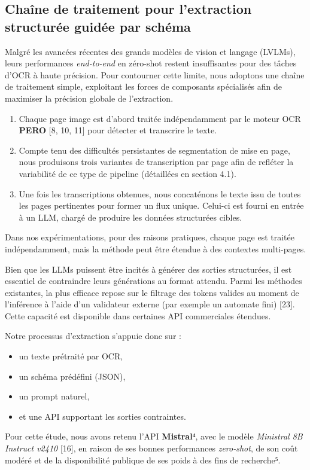 \subsection{Chaîne de traitement pour l’extraction structurée guidée par schéma}

Malgré les avancées récentes des grands modèles de vision et langage (LVLMs), leurs performances \emph{end-to-end} en zéro-shot restent insuffisantes pour des tâches d’OCR à haute précision. Pour contourner cette limite, nous adoptons une chaîne de traitement simple, exploitant les forces de composants spécialisés afin de maximiser la précision globale de l’extraction.

\begin{enumerate}
\item Chaque page image est d’abord traitée indépendamment par le moteur OCR \textbf{PERO} [8, 10, 11] pour détecter et transcrire le texte.
\item Compte tenu des difficultés persistantes de segmentation de mise en page, nous produisons trois variantes de transcription par page afin de refléter la variabilité de ce type de pipeline (détaillées en section 4.1).
\item Une fois les transcriptions obtenues, nous concaténons le texte issu de toutes les pages pertinentes pour former un flux unique. Celui-ci est fourni en entrée à un LLM, chargé de produire les données structurées cibles.

\end{enumerate}
Dans nos expérimentations, pour des raisons pratiques, chaque page est traitée indépendamment, mais la méthode peut être étendue à des contextes multi-pages.

Bien que les LLMs puissent être incités à générer des sorties structurées, il est essentiel de contraindre leurs générations au format attendu. Parmi les méthodes existantes, la plus efficace repose sur le filtrage des tokens valides au moment de l’inférence à l’aide d’un validateur externe (par exemple un automate fini) [23]. Cette capacité est disponible dans certaines API commerciales étendues.

Notre processus d’extraction s’appuie donc sur :

\begin{itemize}
\item un texte prétraité par OCR,
\item un schéma prédéfini (JSON),
\item un prompt naturel,
\item et une API supportant les sorties contraintes.

\end{itemize}
Pour cette étude, nous avons retenu l’API \textbf{Mistral}⁴, avec le modèle \emph{Ministral 8B Instruct v2410} [16], en raison de ses bonnes performances \emph{zero-shot}, de son coût modéré et de la disponibilité publique de ses poids à des fins de recherche⁵.

